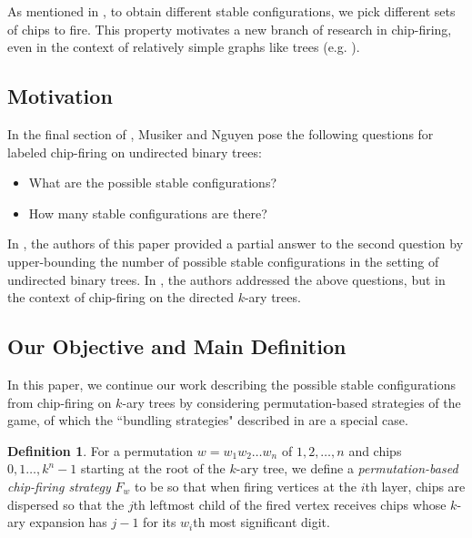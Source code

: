 \documentclass[final]{dmtcs-episciences}
\theoremstyle{definition}
\newtheorem{definition}{Definition}%
\theoremstyle{remark}
\begin{document}
As mentioned in \cite{MR4887467}, to obtain different stable configurations, we pick different sets of chips to fire. This property motivates a new branch of research in chip-firing, even in the context of relatively simple graphs like trees (e.g. \cite{MR4827886, inagaki2024chipfiringundirectedbinarytrees}).

\subsection{Motivation}
In the final section of \cite{MR4827886}, Musiker and Nguyen pose the following questions for labeled chip-firing on undirected binary trees:
\begin{itemize}
    \item What are the possible stable configurations?
    \item How many stable configurations are there?
\end{itemize}
In \cite{inagaki2024chipfiringundirectedbinarytrees}, the authors of this paper provided a partial answer to the second question by upper-bounding the number of possible stable configurations in the setting of undirected binary trees. In \cite{MR4887467}, the authors addressed the above questions, but in the context of chip-firing on the directed $k$-ary trees. 

\subsection{Our Objective and Main Definition}\label{sec:ObjectiveMainDefinition}
In this paper, we continue our work describing the possible stable configurations from chip-firing on $k$-ary trees by considering permutation-based strategies of the game, of which the ``bundling strategies" described in \cite{MR4887467} are a special case.

\begin{definition}\label{def:maindef}
For a permutation $w = w_1w_2\dots w_n$ of $1,2, \dots, n$ and chips $0,1\dots, k^n-1$ starting at the root of the $k$-ary tree, we define a \textit{permutation-based chip-firing strategy} $F_w$ to be so that when firing vertices at the $i$th layer, chips are dispersed so that the $j$th leftmost child of the fired vertex receives chips whose $k$-ary expansion has $j-1$ for its $w_i$th most significant digit.\end{definition}
\end{document}
